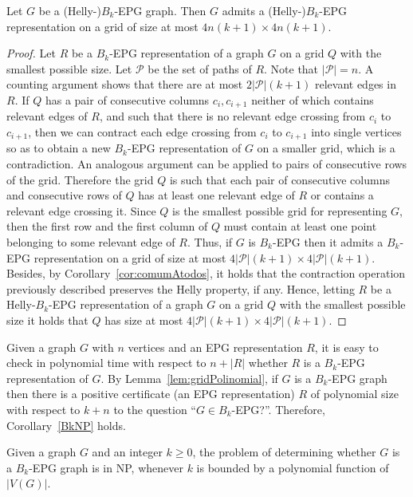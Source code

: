 \begin{lemma}\label{lem:gridPolinomial}
Let $G$ be a (Helly-)$B_k$-EPG graph. Then $G$ admits a (Helly-)$B_k$-EPG representation on a grid of size at most $4n(k+1) \times 4n(k+1)$.
\end{lemma}
\begin{proof}
Let $R$ be a $B_k$-EPG representation of a graph $G$ on a grid $Q$ with the smallest possible size.
Let $\mathcal{P}$ be the set of paths of $R$. Note that $|\mathcal{P}|=n$.
A counting argument shows that there are at most $2|\mathcal{P}|(k+1)$ relevant edges in $R$. 
 If $Q$ has a pair of consecutive columns $c_i,c_{i+1}$ neither of which contains relevant edges of $R$, and such that there is no relevant edge crossing from $c_i$ to $c_{i+1}$, then we can contract each edge crossing from $c_i$ to $c_{i+1}$ into single vertices so as to obtain a new  $B_k$-EPG representation of $G$ on a smaller grid, which is a contradiction. An analogous argument can be applied to pairs of consecutive rows of the grid.
 Therefore the grid $Q$ is such that each pair of consecutive columns and consecutive rows of $Q$  has at least one relevant edge of $R$ or contains a relevant edge crossing it.  
  Since $Q$ is the smallest possible grid for representing $G$, then the first row and the first column of $Q$ must contain at least one point belonging to some relevant edge of $R$. 
Thus, if $G$ is $B_k$-EPG then it admits a $B_k$-EPG representation on a grid of size at most $4|\mathcal{P}|(k+1) \times 4|\mathcal{P}|(k+1)$.
Besides, by Corollary~\ref{cor:comumAtodos}, it holds that the contraction operation previously described preserves the Helly property, if any. Hence, letting $R$ be a Helly-$B_k$-EPG representation of a graph $G$ on a grid $Q$ with the smallest possible size it holds that $Q$ has size at most $4|\mathcal{P}|(k+1) \times 4|\mathcal{P}|(k+1)$.\end{proof}

Given a graph $G$ with $n$ vertices and an EPG representation $R$, it is easy to check in polynomial time with respect to $n +|R|$ whether $R$ is a $B_k$-EPG representation of $G$. By Lemma~\ref{lem:gridPolinomial}, if $G$ is a $B_k$-EPG graph then there is a positive certificate (an EPG representation) $R$ of polynomial size  with respect to $k+n$ to the question ``$G\in B_k$-EPG?''. Therefore, Corollary~\ref{BkNP} holds.

\begin{corollary}\label{BkNP}
Given a graph $G$ and an integer $k\geq 0$, the problem of determining whether $G$ is a $B_k$-EPG graph is in NP, whenever $k$ is bounded by a polynomial function of $|V(G)|$.
\end{corollary}

